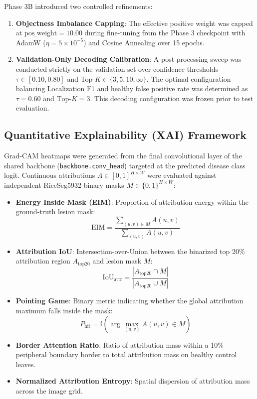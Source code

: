 Phase 3B introduced two controlled refinements:
\begin{enumerate}
    \item \textbf{Objectness Imbalance Capping}: The effective positive weight was capped at $\text{pos\_weight} = 10.00$ during fine-tuning from the Phase 3 checkpoint with AdamW ($\eta = 5 \times 10^{-5}$) and Cosine Annealing over 15 epochs.
    \item \textbf{Validation-Only Decoding Calibration}: A post-processing sweep was conducted strictly on the validation set over confidence thresholds $\tau \in [0.10, 0.80]$ and Top-$K \in \{3, 5, 10, \infty\}$. The optimal configuration balancing Localization F1 and healthy false positive rate was determined as $\tau = 0.60$ and $\text{Top-}K = 3$. This decoding configuration was frozen prior to test evaluation.
\end{enumerate}

\subsection{Quantitative Explainability (XAI) Framework}
Grad-CAM heatmaps were generated from the final convolutional layer of the shared backbone (\texttt{backbone.conv\_head}) targeted at the predicted disease class logit. Continuous attributions $A \in [0, 1]^{H \times W}$ were evaluated against independent RiceSeg5932 binary masks $M \in \{0, 1\}^{H \times W}$:
\begin{itemize}
    \item \textbf{Energy Inside Mask (EIM)}: Proportion of attribution energy within the ground-truth lesion mask:
    \begin{equation}
    \text{EIM} = \frac{\sum_{(u,v) \in M} A(u,v)}{\sum_{(u,v)} A(u,v)}
    \end{equation}
    \item \textbf{Attribution IoU}: Intersection-over-Union between the binarized top 20\% attribution region $A_{\text{top20}}$ and lesion mask $M$:
    \begin{equation}
    \text{IoU}_{\text{attr}} = \frac{|A_{\text{top20}} \cap M|}{|A_{\text{top20}} \cup M|}
    \end{equation}
    \item \textbf{Pointing Game}: Binary metric indicating whether the global attribution maximum falls inside the mask:
    \begin{equation}
    P_{\text{hit}} = \mathbb{I}\left( \arg\max_{(u,v)} A(u,v) \in M \right)
    \end{equation}
    \item \textbf{Border Attention Ratio}: Ratio of attribution mass within a 10\% peripheral boundary border to total attribution mass on healthy control leaves.
    \item \textbf{Normalized Attribution Entropy}: Spatial dispersion of attribution mass across the image grid.
\end{itemize}

